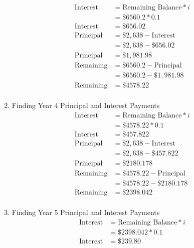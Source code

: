 \documentclass[../INDE250HW.tex]{subfiles}
\begin{document}
\begin{enumerate}
\begin{equation*}
\begin{aligned}
            \text{Interest} &= \text{Remaining Balance} * i \\
                            &= \$6560.2 * 0.1 \\
            \text{Interest} &= \$656.02 \\
            \text{Principal} &= \$2,638 - \text{Interest} \\
                             &= \$2,638 - \$656.02 \\
            \text{Principal} &= \$1,981.98 \\
            \text{Remaining} &= \$6560.2 - \text{Principal} \\
                             &= \$6560.2 - \$1,981.98 \\
            \text{Remaining} &= \$4578.22 \\
        \end{aligned}
    \end{equation*} 
    \item Finding Year 4 Principal and Interest Payments
    \begin{equation*}
        \begin{aligned}
            \text{Interest} &= \text{Remaining Balance} * i \\
                            &= \$4578.22 * 0.1 \\
            \text{Interest} &= \$457.822 \\
            \text{Principal} &= \$2,638 - \text{Interest} \\
                             &= \$2,638 - \$457.822 \\
            \text{Principal} &= \$2180.178 \\
            \text{Remaining} &= \$4578.22 - \text{Principal} \\
                             &= \$4578.22 - \$2180.178 \\
            \text{Remaining} &= \$2398.042 \\
        \end{aligned}
    \end{equation*} 
    \item Finding Year 5 Principal and Interest Payments
    \begin{equation*}
        \begin{aligned}
            \text{Interest} &= \text{Remaining Balance} * i \\
                            &= \$2398.042 * 0.1 \\
            \text{Interest} &= \$239.80 \\

\end{aligned}
\end{equation*}
\end{enumerate}
\end{document}
